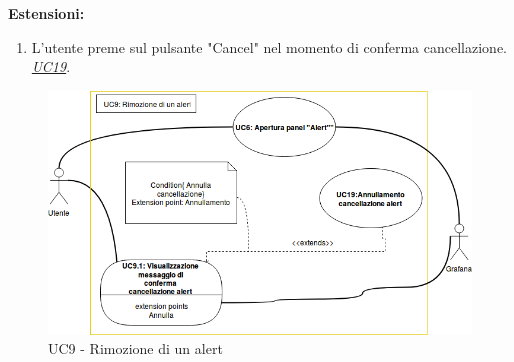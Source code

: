                     \textbf{Estensioni:} 
                    \begin{enumerate}
                            \item L'utente preme sul pulsante "Cancel" nel momento di conferma cancellazione. \underline{\textit{UC19}}.
                        \end{enumerate}
                        
                        \begin{figure}[!htbp]
                    	\centering
                    	\includegraphics[width=\textwidth]{UC9.png}
                    	\caption{UC9 - Rimozione di un alert}
                    	\label{uc9}
                    \end{figure}   
                        
